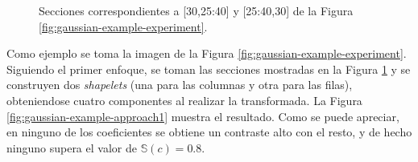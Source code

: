 \begin{figure}
	\centering
	\caption{ Secciones correspondientes a [30,25:40] y [25:40,30] de la Figura \ref{fig:gaussian-example-experiment}.} \label{fig:lines-experiment}
\end{figure}

Como ejemplo se toma la imagen de la Figura \ref{fig:gaussian-example-experiment}. Siguiendo el primer enfoque,
se toman las secciones mostradas en la Figura
\ref{fig:lines-experiment} y se construyen dos \textit{shapelets} (una para las columnas y otra para las filas), obteniendose cuatro componentes
al realizar la transformada. La Figura \ref{fig:gaussian-example-approach1} muestra el resultado. Como se puede apreciar, en ninguno de 
los coeficientes se obtiene un contraste alto con el resto, y de hecho ninguno supera el valor de $\mathbb{S}(c)=0.8$.

